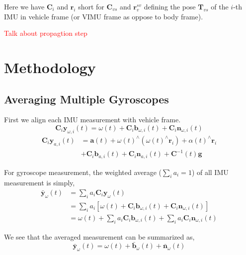 \documentclass[conference]{IEEEtran}
\begin{document}
Here we have $\textbf{C}_i$ and $\textbf{r}_i$ short for $\textbf{C}_{vs}$ and $\textbf{r}_v^{sv}$ defining the pose $\textbf{T}_{vs}$ of the $i$-th IMU in vehicle frame (or VIMU frame as oppose to body frame).

\textcolor{red}{Talk about propagtion step}

\section{Methodology}\label{methodology}

\subsection{Averaging Multiple Gyroscopes}

First we align each IMU measurement with vehicle frame.
\begin{equation}
    \textbf{C}_{i} \textbf{y}_{\omega, i}(t) = \omega(t) + \textbf{C}_{i} \textbf{b}_{\omega, i}(t) + \textbf{C}_{i} \textbf{n}_{\omega,i}(t)
\end{equation}
\begin{equation}\label{eqn_accel}
\begin{split}
    \textbf{C}_{i} \textbf{y}_{a,i}(t) &= \textbf{a}(t) + \omega(t)^\wedge (\omega(t)^\wedge \textbf{r}_i) + \alpha(t)^\wedge \textbf{r}_i \\
    &+ \textbf{C}_{i} \textbf{b}_{a,i}(t) + \textbf{C}_{i} \textbf{n}_{a,i}(t) + \textbf{C}^{-1}(t)\textbf{g}
\end{split}
\end{equation}

For gyroscope measurement, the weighted average ($\sum_i{a_i} = 1$) of all IMU measurement is simply,
\begin{equation}
\begin{split}
    \bar{\textbf{y}}_\omega(t) &= \sum_i{a_i \textbf{C}_{i} \textbf{y}_\omega(t)} \\
    &= \sum_i{a_i \left[ \omega(t) + \textbf{C}_{i} \textbf{b}_{\omega, i}(t) + \textbf{C}_{i} \textbf{n}_{\omega,i}(t) \right]} \\
    &= \omega(t) + \sum_i{a_i \textbf{C}_{i} \textbf{b}_{\omega, i}(t)} + \sum_i{a_i \textbf{C}_{i} \textbf{n}_{\omega,i}(t)}
\end{split}
\end{equation}

We see that the averaged measurement can be summarized as,
\begin{equation}
    \bar{\textbf{y}}_\omega(t) = \omega(t) + \bar{\textbf{b}}_\omega(t) + \bar{\textbf{n}}_\omega(t)
\end{equation}
\end{document}
